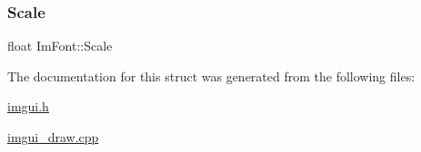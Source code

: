 \mbox{\label{struct_im_font_ae98fb07fd8862a7243d77b11f38bba19}} 
\subsubsection{\texorpdfstring{Scale}{Scale}}
{\footnotesize\ttfamily float Im\+Font\+::\+Scale}



The documentation for this struct was generated from the following files\+:\begin{DoxyCompactItemize}
\item 
\mbox{\hyperlink{imgui_8h}{imgui.\+h}}\item 
\mbox{\hyperlink{imgui__draw_8cpp}{imgui\+\_\+draw.\+cpp}}\end{DoxyCompactItemize}

